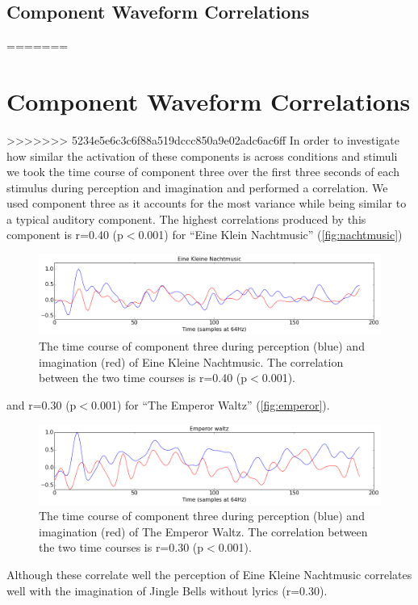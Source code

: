 \subsection*{Component Waveform Correlations}
=======
\newpage
\section{Component Waveform Correlations}
>>>>>>> 5234e5e6c3c6f88a519dccc850a9e02adc6ac6ff
In order to investigate how similar the activation of these components is across conditions and stimuli we took the time course of component three over the first three seconds of each stimulus during perception and imagination and performed a correlation.
We used component three as it accounts for the most variance while being similar to a typical auditory component.
The highest correlations produced by this component is r=0.40 (p$<$0.001) for ``Eine Klein Nachtmusic'' (\autoref{fig:nachtmusic})
\begin{figure}[htbp]
  \centerline{\includegraphics[scale=0.4]{Figures/EineKleineCorrelation}}
  \caption{The time course of component three during perception (blue) and imagination (red) of Eine Kleine Nachtmusic. The correlation between the two time courses is r=0.40 (p$<$0.001).}
  \label{fig:nachtmusic}
\end{figure}
and r=0.30 (p$<$0.001) for ``The Emperor Waltz'' (\autoref{fig:emperor}).
\begin{figure}[htbp]
  \centerline{\includegraphics[scale=0.4]{Figures/EmperorCorrelation}}
  \caption{The time course of component three during perception (blue) and imagination (red) of The Emperor Waltz. The correlation between the two time courses is r=0.30 (p$<$0.001).}
  \label{fig:emperor}
\end{figure}
Although these correlate well the perception of Eine Kleine Nachtmusic correlates well with the imagination of Jingle Bells without lyrics (r=0.30). 
